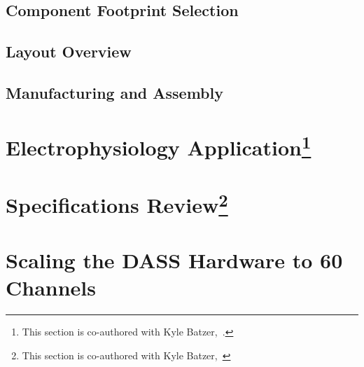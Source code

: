 \documentclass{article}
\begin{document}



\subsection{Component Footprint Selection}



\subsection{Layout Overview}



\subsection{Manufacturing and Assembly}



\section[Electrophysiology Application]{Electrophysiology Application\footnote{This section is co-authored with Kyle Batzer,~\cite{BatzerMSEE}.}}\label{sec:app}



\section[Specifications Review]{Specifications Review\footnote{This section is co-authored with Kyle Batzer,~\cite{BatzerMSEE}}}



\section{Scaling the DASS Hardware to 60 Channels}\label{sec:scaling}


\end{document}

